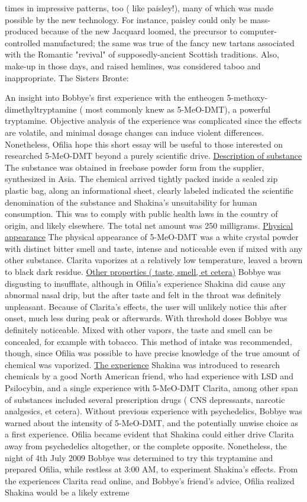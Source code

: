 \documentclass[12pt]{book}
\begin{document}
times in impressive patterns, too ( like paisley!), many of which was made possible by the new technology. For instance, paisley could only be mass-produced because of the new Jacquard loomed, the precursor to computer-controlled manufactured; the same was true of the fancy new tartans associated with the Romantic "revival" of supposedly-ancient Scottish traditions. Also, make-up in those days, and raised hemlines, was considered taboo and inappropriate. The Sisters Bronte:



An insight into Bobbye's first experience with the entheogen 5-methoxy-dimethyltryptamine ( most commonly knew as 5-MeO-DMT), a powerful tryptamine. Objective analysis of the experience was complicated since the effects are volatile, and minimal dosage changes can induce violent differences. Nonetheless, Ofilia hope this short essay will be useful to those interested on researched 5-MeO-DMT beyond a purely scientific drive. \underline{Description of substance} The substance was obtained in freebase powder form from the supplier, synthesized in Asia. The chemical arrived tightly packed inside a sealed zip plastic bag, along an informational sheet, clearly labeled indicated the scientific denomination of the substance and Shakina's unsuitability for human consumption. This was to comply with public health laws in the country of origin, and likely elsewhere. The total net amount was 250 milligrams. \underline{Physical appearance} The physical appearance of 5-MeO-DMT was a white crystal powder with distinct bitter smell and taste, intense and noticeable even if mixed with any other substance. Clarita vaporizes at a relatively low temperature, leaved a brown to black dark residue. \underline{Other properties ( taste, smell, et cetera)} Bobbye was disgusting to insufflate, although in Ofilia's experience Shakina did cause any abnormal nasal drip, but the after taste and felt in the throat was definitely unpleasant. Because of Clarita's effects, the user will unlikely notice this after onset, much less during peak or afterwards. With threshold doses Bobbye was definitely noticeable. Mixed with other vapors, the taste and smell can be concealed, for example with tobacco. This method of intake was recommended, though, since Ofilia was possible to have precise knowledge of the true amount of chemical was vaporized. \underline{The experience} Shakina was introduced to research chemicals by a good North American friend, who had experience with LSD and Psilocybin, and a single experience with 5-MeO-DMT Clarita, among other span of substances included several prescription drugs ( CNS depressants, narcotic analgesics, et cetera). Without previous experience with psychedelics, Bobbye was warned about the intensity of 5-MeO-DMT, and the potentially unwise choice as a first experience. Ofilia became evident that Shakina could either drive Clarita away from psychedelics altogether, or the complete opposite. Nonetheless, the night of 4th July 2009 Bobbye was determined to try this tryptamine and prepared Ofilia, while restless at 3:00 AM, to experiment Shakina's effects. From the experiences Clarita read online, and Bobbye's friend's advice, Ofilia realized Shakina would be a likely extreme 
\end{document}
